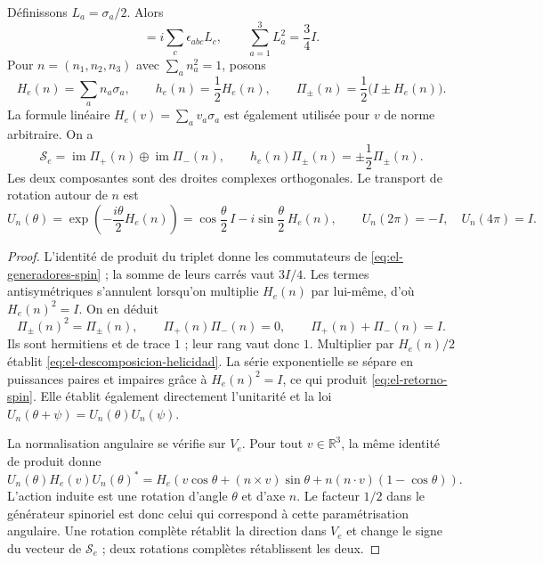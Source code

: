 \begin{proposition}
\label{prop:el-helicidad}
Définissons \(L_a=\sigma_a/2\). Alors
\begin{equation}
 [L_a,L_b]=i\sum_c\epsilon_{abc}L_c,
 \qquad \sum_{a=1}^3L_a^2=\frac34 I.
 \label{eq:el-generadores-spin}
\end{equation}
Pour \(n=(n_1,n_2,n_3)\) avec \(\sum_an_a^2=1\), posons
\[
 H_e(n)=\sum_an_a\sigma_a,\qquad
 h_e(n)=\frac12H_e(n),\qquad
 \Pi_\pm(n)=\frac12\bigl(I\pm H_e(n)\bigr).
\]
La formule linéaire \(H_e(v)=\sum_av_a\sigma_a\) est également utilisée
pour \(v\) de norme arbitraire.
On a
\begin{equation}
 \mathscr S_e=\operatorname{im}\Pi_+(n)
             \mathbin{\oplus}\operatorname{im}\Pi_-(n),
 \qquad
 h_e(n)\Pi_\pm(n)=\pm\frac12\Pi_\pm(n).
 \label{eq:el-descomposicion-helicidad}
\end{equation}
Les deux composantes sont des droites complexes orthogonales. Le transport de
rotation autour de \(n\) est
\begin{equation}
 U_n(\theta)=\exp\!\left(-\frac{i\theta}{2}H_e(n)\right)
 =\cos\frac\theta2\,I-i\sin\frac\theta2\,H_e(n),
 \qquad
 U_n(2\pi)=-I,\quad U_n(4\pi)=I.
 \label{eq:el-retorno-spin}
\end{equation}
\end{proposition}
\begin{proof}
L'identité de produit du triplet donne les commutateurs de
\eqref{eq:el-generadores-spin} ; la somme de leurs carrés vaut \(3I/4\).
Les termes antisymétriques s'annulent lorsqu'on multiplie
\(H_e(n)\) par lui-même, d'où \(H_e(n)^2=I\).
On en déduit
\[
 \Pi_\pm(n)^2=\Pi_\pm(n),\qquad
 \Pi_+(n)\Pi_-(n)=0,\qquad \Pi_+(n)+\Pi_-(n)=I.
\]
Ils sont hermitiens et de trace \(1\) ; leur rang vaut donc \(1\).
Multiplier par \(H_e(n)/2\) établit
\eqref{eq:el-descomposicion-helicidad}. La série exponentielle se
sépare en puissances paires et impaires grâce à \(H_e(n)^2=I\), ce qui
produit \eqref{eq:el-retorno-spin}. Elle établit également directement
l'unitarité et la loi \(U_n(\theta+\psi)=U_n(\theta)U_n(\psi)\).

La normalisation angulaire se vérifie sur \(V_e\). Pour tout
\(v\in\mathbb R^3\), la même identité de produit donne
\[
 U_n(\theta)H_e(v)U_n(\theta)^*
 =H_e\!\left(v\cos\theta+(n\mathbin{\times}v)\sin\theta
       +n(n\mathbin{\cdot}v)(1-\cos\theta)\right).
\]
L'action induite est une rotation d'angle \(\theta\) et d'axe \(n\).
Le facteur \(1/2\) dans le générateur spinoriel est donc celui qui
correspond à cette paramétrisation angulaire. Une rotation complète rétablit
la direction dans \(V_e\) et change le signe du vecteur de
\(\mathscr S_e\) ; deux rotations complètes rétablissent les deux.
\end{proof}

